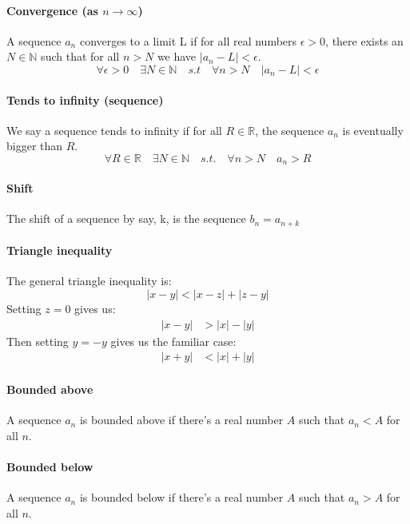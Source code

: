 \documentclass{article}
\newcommand{\R}{\mathbb{R}}
\newcommand{\N}{\mathbb{N}}
\begin{document}
\paragraph{Convergence (as $ n \to \infty $)}
A sequence $ a_{n} $ converges to a limit L if for all real numbers $ \epsilon > 0 $, there exists an $ N \in \N $ such that for all $ n > N $ we have $ |a_{n} - L| < \epsilon $.
\begin{equation}
\forall \epsilon > 0 \quad \exists N \in \N \quad s.t \quad \forall n > N \quad |a_{n} - L| < \epsilon
\end{equation}
\paragraph{Tends to infinity (sequence)}
We say a sequence tends to infinity if for all $ R \in \R $, the sequence $ a_{n} $ is eventually bigger than $ R $.
\begin{equation}
\forall R \in \R \quad \exists N \in \N \quad s.t. \quad \forall n > N \quad a_{n} > R
\end{equation}
\paragraph{Shift}
The shift of a sequence by say, k, is the sequence $ b_{n} = a_{n + k} $
\paragraph{Triangle inequality}
The general triangle inequality is:
\begin{equation}
|x - y| < |x - z| + |z - y|
\end{equation}
Setting $ z = 0 $ gives us:
\begin{align}
|x - y| & > |x| - |y|
\end{align}
Then setting $ y = - y $ gives us the familiar case:
\begin{align}
|x + y| & < |x| + |y|
\end{align}
\paragraph{Bounded above}
A sequence $ a_{n} $ is bounded above if there's a real number $ A $ such that $ a_{n} < A $ for all $ n $.
\paragraph{Bounded below}
A sequence $ a_{n} $ is bounded below if there's a real number $ A $ such that $ a_{n} > A $ for all $ n $.
\end{document}
